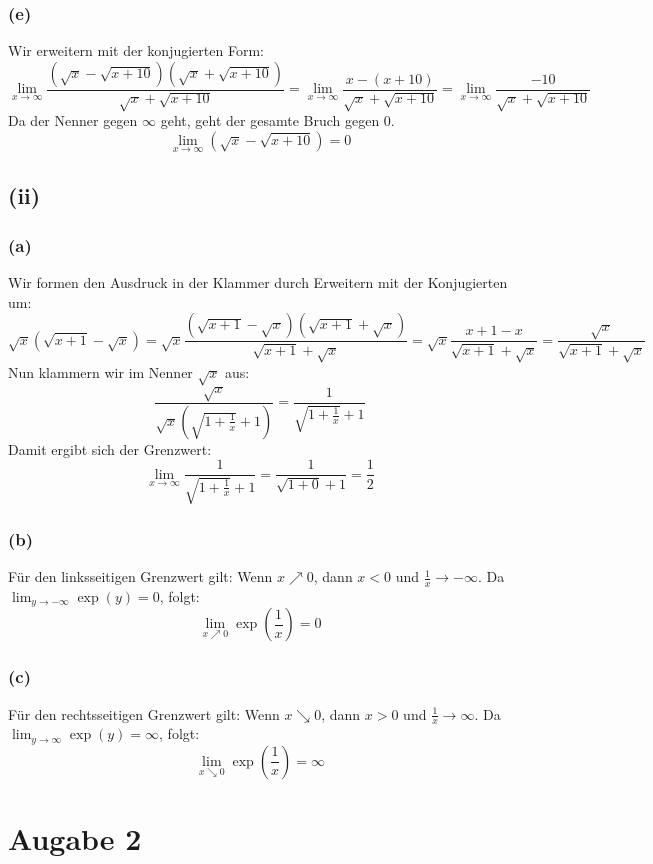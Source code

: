 \documentclass{article}
\begin{document}
\subsubsection*{(e)}
Wir erweitern mit der konjugierten Form:
\[\lim_{x\to\infty} \frac{(\sqrt{x} - \sqrt{x+10})(\sqrt{x} + \sqrt{x+10})}{\sqrt{x} + \sqrt{x+10}} = \lim_{x\to\infty} \frac{x - (x+10)}{\sqrt{x} + \sqrt{x+10}} = \lim_{x\to\infty} \frac{-10}{\sqrt{x} + \sqrt{x+10}}\]
Da der Nenner gegen \(\infty\) geht, geht der gesamte Bruch gegen 0.
\[\lim_{x\to\infty} (\sqrt{x} - \sqrt{x+10}) = 0\]

\subsection*{(ii)}
\subsubsection*{(a)}
Wir formen den Ausdruck in der Klammer durch Erweitern mit der Konjugierten um:
\[\sqrt{x}(\sqrt{x+1} - \sqrt{x}) = \sqrt{x} \frac{(\sqrt{x+1} - \sqrt{x})(\sqrt{x+1} + \sqrt{x})}{\sqrt{x+1} + \sqrt{x}} = \sqrt{x} \frac{x+1-x}{\sqrt{x+1} + \sqrt{x}} = \frac{\sqrt{x}}{\sqrt{x+1} + \sqrt{x}}\]
Nun klammern wir im Nenner \(\sqrt{x}\) aus:
\[\frac{\sqrt{x}}{\sqrt{x}(\sqrt{1+\frac{1}{x}} + 1)} = \frac{1}{\sqrt{1+\frac{1}{x}} + 1}\]
Damit ergibt sich der Grenzwert:
\[\lim_{x\to\infty} \frac{1}{\sqrt{1+\frac{1}{x}} + 1} = \frac{1}{\sqrt{1+0} + 1} = \frac{1}{2}\]

\subsubsection*{(b)}
Für den linksseitigen Grenzwert gilt: Wenn \(x \nearrow 0\), dann \(x<0\) und \(\frac{1}{x} \to -\infty\).
Da \(\lim_{y\to-\infty} \exp(y) = 0\), folgt:
\[\lim_{x\nearrow0} \exp\left(\frac{1}{x}\right) = 0\]

\subsubsection*{(c)}
Für den rechtsseitigen Grenzwert gilt: Wenn \(x \searrow 0\), dann \(x>0\) und \(\frac{1}{x} \to \infty\).
Da \(\lim_{y\to\infty} \exp(y) = \infty\), folgt:
\[\lim_{x\searrow0} \exp\left(\frac{1}{x}\right) = \infty\]

\section*{Augabe 2}
\end{document}

